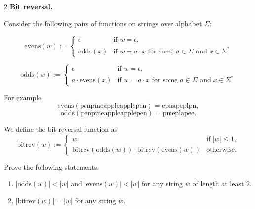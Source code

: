 \documentclass[12pt]{article}
\begin{document}
\newpage 

\begin{problem}{2}
\textbf{Bit reversal.} 

    Consider the following pairs of functions on strings over alphabet $\Sigma$:

    \[ \text{evens}(w) := \begin{cases} 
        \epsilon & \text{if } w = \epsilon, \\ \text{odds}(x) & \text{if } w = a \cdot x \text{ for some } a \in \Sigma \text{ and } x \in \Sigma^*
    \end{cases} \]

    \[\text{odds}(w) :=\begin{cases}
        \epsilon & \text{if } w = \epsilon, \\a \cdot \text{evens}(x) & \text{if } w = a \cdot x \text{ for some } a \in \Sigma \text{ and } x \in \Sigma^*
    \end{cases}\]

    For example,
    \[
    \text{evens}(\text{penpineappleapplepen}) = \text{epnapeplpn},
    \]
    \[
    \text{odds}(\text{penpineappleapplepen}) = \text{pnieplapee}.
    \]

    We define the bit-reversal function as
    \[
    \text{bitrev}(w) :=
    \begin{cases}
    w & \text{if } |w| \le 1, \\
    \text{bitrev}(\text{odds}(w)) \cdot \text{bitrev}(\text{evens}(w)) & \text{otherwise}.
    \end{cases}
    \]

    Prove the following statements:
    \begin{enumerate}
    \item[(a)] $|\text{odds}(w)| < |w|$ and $|\text{evens}(w)| < |w|$ for any string $w$ of length at least $2$.

    \item[(b)] $|\text{bitrev}(w)| = |w|$ for any string $w$.
    \end{enumerate}
\end{problem}
\end{document}
